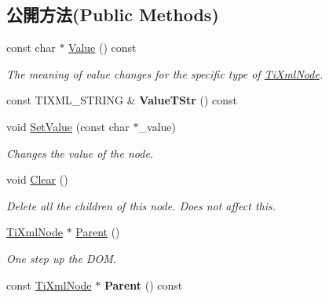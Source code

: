 \subsection*{公開方法(Public Methods)}
\begin{DoxyCompactItemize}
\item 
const char $\ast$ \hyperlink{class_ti_xml_node_a77943eb90d12c2892b1337a9f5918b41}{Value} () const 
\begin{DoxyCompactList}\small\item\em The meaning of \textquotesingle{}value\textquotesingle{} changes for the specific type of \hyperlink{class_ti_xml_node}{Ti\+Xml\+Node}. \end{DoxyCompactList}\item 
const T\+I\+X\+M\+L\+\_\+\+S\+T\+R\+I\+NG \& {\bfseries Value\+T\+Str} () const \hypertarget{class_ti_xml_node_a83ece13d2ea66dac66e0b21332229239}{}\label{class_ti_xml_node_a83ece13d2ea66dac66e0b21332229239}

\item 
void \hyperlink{class_ti_xml_node_a2a38329ca5d3f28f98ce932b8299ae90}{Set\+Value} (const char $\ast$\+\_\+value)
\begin{DoxyCompactList}\small\item\em Changes the value of the node. \end{DoxyCompactList}\item 
void \hyperlink{class_ti_xml_node_a708e7f953df61d4d2d12f73171550a4b}{Clear} ()\hypertarget{class_ti_xml_node_a708e7f953df61d4d2d12f73171550a4b}{}\label{class_ti_xml_node_a708e7f953df61d4d2d12f73171550a4b}

\begin{DoxyCompactList}\small\item\em Delete all the children of this node. Does not affect \textquotesingle{}this\textquotesingle{}. \end{DoxyCompactList}\item 
\hyperlink{class_ti_xml_node}{Ti\+Xml\+Node} $\ast$ \hyperlink{class_ti_xml_node_ab643043132ffd794f8602685d34a982e}{Parent} ()\hypertarget{class_ti_xml_node_ab643043132ffd794f8602685d34a982e}{}\label{class_ti_xml_node_ab643043132ffd794f8602685d34a982e}

\begin{DoxyCompactList}\small\item\em One step up the D\+OM. \end{DoxyCompactList}\item 
const \hyperlink{class_ti_xml_node}{Ti\+Xml\+Node} $\ast$ {\bfseries Parent} () const \hypertarget{class_ti_xml_node_a78878709e53066f06eb4fcbcdd3a5260}{}\label{class_ti_xml_node_a78878709e53066f06eb4fcbcdd3a5260}


\end{DoxyCompactItemize}
